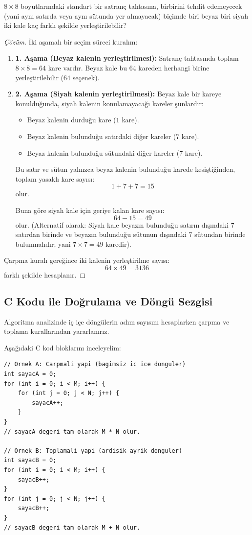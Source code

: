 \begin{example}
$8 \times 8$ boyutlarındaki standart bir satranç tahtasına, birbirini tehdit edemeyecek (yani aynı satırda veya aynı sütunda yer almayacak) biçimde biri beyaz biri siyah iki kale kaç farklı şekilde yerleştirilebilir?
\end{example}
\begin{proof}[Çözüm]
İki aşamalı bir seçim süreci kuralım:
\begin{enumerate}
  \item \textbf{1. Aşama (Beyaz kalenin yerleştirilmesi):}
  Satranç tahtasında toplam $8 \times 8 = 64$ kare vardır. Beyaz kale bu $64$ kareden herhangi birine yerleştirilebilir ($64$ seçenek).
  
  \item \textbf{2. Aşama (Siyah kalenin yerleştirilmesi):}
  Beyaz kale bir kareye konulduğunda, siyah kalenin konulamayacağı kareler şunlardır:
  \begin{itemize}
    \item Beyaz kalenin durduğu kare ($1$ kare).
    \item Beyaz kalenin bulunduğu satırdaki diğer kareler ($7$ kare).
    \item Beyaz kalenin bulunduğu sütundaki diğer kareler ($7$ kare).
  \end{itemize}
  Bu satır ve sütun yalnızca beyaz kalenin bulunduğu karede kesiştiğinden, toplam yasaklı kare sayısı:
  \[ 1 + 7 + 7 = 15 \]
  olur.
  
  Buna göre siyah kale için geriye kalan kare sayısı:
  \[ 64 - 15 = 49 \]
  olur. (Alternatif olarak: Siyah kale beyazın bulunduğu satırın dışındaki $7$ satırdan birinde ve beyazın bulunduğu sütunun dışındaki $7$ sütundan birinde bulunmalıdır; yani $7 \times 7 = 49$ karedir).
\end{enumerate}
Çarpma kuralı gereğince iki kalenin yerleştirilme sayısı:
\[ 64 \times 49 = 3136 \]
farklı şekilde hesaplanır.
\end{proof}

\subsection{C Kodu ile Doğrulama ve Döngü Sezgisi}

Algoritma analizinde iç içe döngülerin adım sayısını hesaplarken çarpma ve toplama kurallarından yararlanırız. 

Aşağıdaki C kod bloklarını inceleyelim:

\begin{lstlisting}[language=CTemel]
// Ornek A: Carpmali yapi (bagimsiz ic ice donguler)
int sayacA = 0;
for (int i = 0; i < M; i++) {
    for (int j = 0; j < N; j++) {
        sayacA++;
    }
}
// sayacA degeri tam olarak M * N olur.

// Ornek B: Toplamali yapi (ardisik ayrik donguler)
int sayacB = 0;
for (int i = 0; i < M; i++) {
    sayacB++;
}
for (int j = 0; j < N; j++) {
    sayacB++;
}
// sayacB degeri tam olarak M + N olur.
\end{lstlisting}

